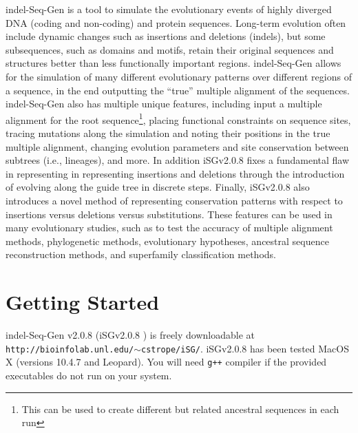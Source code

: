 \documentclass[10pt]{article}
\newcommand{\version}{2.0.8 }
\newcommand{\iSGcurrentshort}{iSGv\version }
\newcommand{\iSGcurrentlong}{indel-Seq-Gen v\version }
\begin{document}
indel-Seq-Gen is a tool to simulate the evolutionary events of highly diverged DNA (coding and non-coding) and protein sequences.  Long-term evolution often include dynamic changes such as insertions and deletions (indels), but some subsequences, such as domains and
motifs, retain their original sequences and structures better than less functionally important regions.  indel-Seq-Gen allows for the simulation of many different evolutionary patterns over different regions of a sequence, in the end outputting the ``true'' multiple alignment of the sequences.  indel-Seq-Gen also has multiple unique features, including input a multiple alignment for the root sequence\footnote{This can be used to create different but related ancestral sequences in each run}, placing functional constraints on sequence sites, tracing mutations along the simulation and noting their positions in the true multiple alignment, changing evolution parameters and site conservation between subtrees (i.e., lineages), and more. In addition \iSGcurrentshort fixes a fundamental flaw in representing in representing insertions and deletions through the introduction of evolving along the guide tree in discrete steps. Finally, \iSGcurrentshort also introduces a novel method of representing conservation patterns with respect to insertions versus deletions versus substitutions. These features can be used in many evolutionary studies, such as to test the accuracy of multiple alignment methods, phylogenetic methods, evolutionary hypotheses, ancestral sequence reconstruction methods, and superfamily classification methods.

\section{Getting Started}

\iSGcurrentlong (\iSGcurrentshort) is freely downloadable at {\tt http://bioinfolab.unl.edu/$\sim$cstrope/iSG/}. \iSGcurrentshort has been tested MacOS X (versions 10.4.7 and Leopard).  You will need {\tt g++} compiler if the provided executables do not run on your system.
\end{document}
